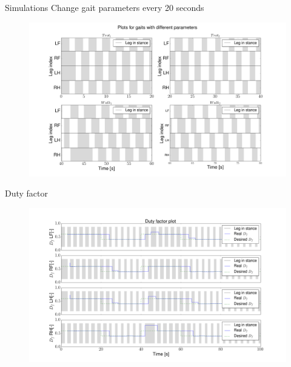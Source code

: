 \documentclass[10pt]{beamer}
\begin{document}
\begin{frame}{Simulations}
Change gait parameters every 20 seconds
\begin{figure}[H]\centering
	\includegraphics[width=1\textwidth]{SyncPlot.png}
\end{figure}
\end{frame}

\begin{frame}{Duty factor}
\vspace{-1cm}
	\begin{figure}[ht]\centering
		\includegraphics[width=1.1\textwidth]{images/DutyFactor.png}
	\end{figure}\vspace{-20pt}
\end{frame}
\end{document}
